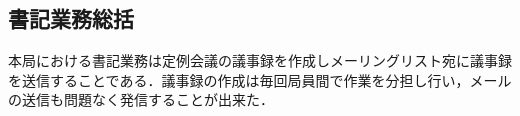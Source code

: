 \subsection*{書記業務総括}

本局における書記業務は定例会議の議事録を作成しメーリングリスト宛に議事録を送信することである．議事録の作成は毎回局員間で作業を分担し行い，メールの送信も問題なく発信することが出来た．
